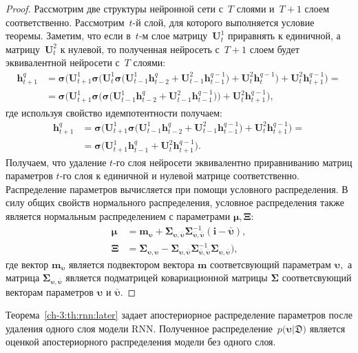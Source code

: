 \begin{proof}
Рассмотрим две структуры нейронной сети с~$T$ слоями и~$T+1$ слоем соответственно. Рассмотрим~$t$-й слой, для которого выполняется условие теоремы. Заметим, что если в~$t$-м слое матрицу~$\mathbf{U}^{1}_{t}$ приравнять к единичной, а матрицу~$\mathbf{U}^{2}_t$ к нулевой, то полученная нейросеть с~$T+1$ слоем будет эквивалентной нейросети с~$T$ слоями:
\[
\begin{aligned}
\mathbf{h}^{q}_{t+1} &= \bm{\sigma}\bigr(\mathbf{U}_{t+1}^{1}\bm{\sigma}\bigr(\mathbf{U}^{1}_{t}\bm{\sigma}\bigr(\mathbf{U}^{1}_{t-1}\mathbf{h}^{q}_{t-2}+\mathbf{U}^{2}_{t-1}\mathbf{h}^{q-1}_{t-1}\bigr)+\mathbf{U}^{2}_{t}\mathbf{h}_{t}^{q-1}\bigr)+\mathbf{U}_{t}^{2}\mathbf{h}^{q-1}_{t+1}\bigr) = \\
&= \bm{\sigma}\bigr(\mathbf{U}_{t+1}^{1}\bm{\sigma}\bigr(\bm{\sigma}\bigr(\mathbf{U}^{1}_{t-1}\mathbf{h}^{q}_{t-2}+\mathbf{U}^{2}_{t-1}\mathbf{h}^{q-1}_{t-1}\bigr)\bigr)+\mathbf{U}_{t}^{2}\mathbf{h}^{q-1}_{t+1}\bigr),
\end{aligned}
\]
где используя свойство идемпотентности получаем:
\[
\begin{aligned}
\mathbf{h}^{q}_{t+1} &= \bm{\sigma}\bigr(\mathbf{U}_{t+1}^{1}\bm{\sigma}\bigr(\mathbf{U}^{1}_{t-1}\mathbf{h}^{q}_{t-2}+\mathbf{U}^{2}_{t-1}\mathbf{h}^{q-1}_{t-1}\bigr)+\mathbf{U}_{t}^{2}\mathbf{h}^{q-1}_{t+1}\bigr) = \\
&= \bm{\sigma}\bigr(\mathbf{U}_{t+1}^{1}\mathbf{h}^{q}_{t-1}+\mathbf{U}_{t}^{2}\mathbf{h}^{q-1}_{t+1}\bigr).
\end{aligned}
\]
Получаем, что удаление $t$-го слоя нейросети эквивалентно приравниванию матриц параметров $t$-го слоя к единичной и нулевой матрице соответственно. Распределение параметров вычисляется при помощи условного распределения. В силу общих свойств нормального распределения, условное распределения также является нормальным распределением с параметрами $\bm{\mu}, \bm{\Xi}:$
\[
\begin{aligned}
\bm{\mu} &= \mathbf{m}_{\bm{\upsilon}}+\bm{\Sigma}_{\bm{\upsilon},\bar{\bm{\upsilon}}} \bm{\Sigma}_{\bar{\bm{\upsilon}},\bar{\bm{\upsilon}}}^{-1} \left(\mathbf{i} - \bar{\bm{\upsilon}}\right), \\
\bm{\Xi} &= \bm{\Sigma}_{\bm{\upsilon},\bm{\upsilon}} - \bm{\Sigma}_{\bm{\upsilon},\bar{\bm{\upsilon}}}\bm{\Sigma}_{\bar{\bm{\upsilon}},\bar{\bm{\upsilon}}}^{-1}\bm{\Sigma}_{\bm{\upsilon},\bar{\bm{\upsilon}}}\bigr),
\end{aligned}
\]
где вектор $\mathbf{m}_{\bm{\upsilon}}$ является подвектором вектора $\mathbf{m}$ соответсвующий параметрам $\bm{\upsilon},$ а матрица $\bm{\Sigma}_{\bm{\upsilon},\bar{\bm{\upsilon}}}$ является подматрицей ковариационной матрицы $\bm{\Sigma}$ соответсвующий векторам параметров $\bm{\upsilon}$ и $\bar{\bm{\upsilon}}.$
\end{proof}
Теорема~\ref{ch-3:th:rnn:later} задает апостериорное распределение параметров после удаления одного слоя модели RNN. Полученное распределение~$p\bigr(\bm{\upsilon}|\mathfrak{D}\bigr)$ является оценкой апостериорного распределения модели без одного слоя.


